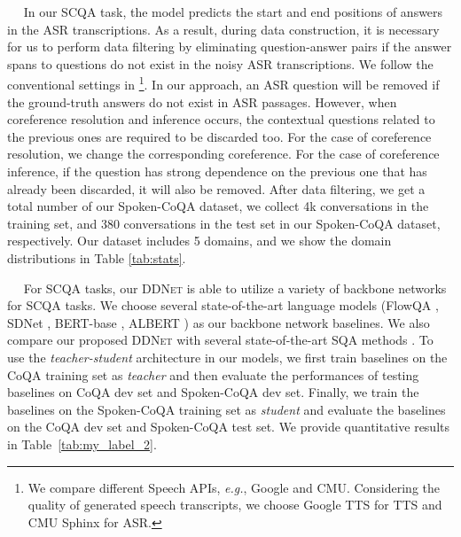 \documentclass[11pt]{article}
\def\eg{\textit{e.g.}}
\newcommand{\myparagraph}[1]{\vspace{2pt}\noindent{\bf{#1}}~~}
\begin{document}
\myparagraph{Data Filtering}
\label{supp:datafilter}
In our SCQA task, the model predicts the start and end positions of answers in the ASR transcriptions. As a result, during data construction, it is necessary for us to perform data filtering by eliminating question-answer pairs if the answer spans to questions do not exist in the noisy ASR transcriptions.
We follow the conventional settings in \cite{lee2018odsqa}\footnote{We compare different Speech APIs, \eg, Google and CMU. Considering the quality of generated speech transcripts, we choose Google TTS for TTS and CMU Sphinx for ASR.}.
In our approach, an ASR question will be removed if the ground-truth answers do not exist in ASR passages. However, when coreference resolution and inference occurs, the contextual questions related to the previous ones are required to be discarded too. For the case of coreference resolution, we change the corresponding coreference. For the case of coreference inference, if the question has strong dependence on the previous one that has already been discarded, it will also be removed. 
After data filtering, we get a total number of our Spoken-CoQA dataset, we collect 4k conversations in the training set, and 380 conversations in the test set in our Spoken-CoQA dataset, respectively. Our dataset includes 5 domains, and we show the domain distributions in Table \ref{tab:stats}.

\myparagraph{Baselines.}
For SCQA tasks, our \textsc{DDNet} is able to utilize a variety of backbone networks for SCQA tasks. We choose several state-of-the-art language models (FlowQA \cite{huang2018flowqa}, SDNet \cite{zhu2018sdnet}, BERT-base \cite{devlin2018bert}, ALBERT \cite{lan2019albert}) as our backbone network baselines. We also compare our proposed \textsc{DDNet} with several state-of-the-art SQA methods \cite{lee2018odsqa,serdyuk2018towards,lee2019mitigating,kuo2020audio}. To use the \textit{teacher-student} architecture in our models, we first train baselines on the CoQA training set as \textit{teacher} and then evaluate the performances of testing baselines on CoQA dev set and Spoken-CoQA dev set. Finally, we train the baselines on the Spoken-CoQA training set as \textit{student} and evaluate the baselines on the CoQA dev set and Spoken-CoQA test set. We provide quantitative results in Table~\ref{tab:my_label_2}.
\end{document}
